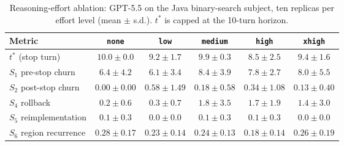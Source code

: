 \begin{table}[t]
\centering
\caption{Reasoning-effort ablation: GPT-5.5 on the Java binary-search subject, ten replicas per effort level (mean $\pm$ s.d.). $t^{*}$ is capped at the 10-turn horizon.}
\label{tab:app-reasoning}
\small
\begin{tabular}{lccccc}
\toprule
Metric & \texttt{none} & \texttt{low} & \texttt{medium} & \texttt{high} & \texttt{xhigh} \\
\midrule
$t^{*}$ (stop turn) & $10.0 \pm 0.0$ & $9.2 \pm 1.7$ & $9.9 \pm 0.3$ & $8.5 \pm 2.5$ & $9.4 \pm 1.6$ \\
$S_1$ pre-stop churn & $6.4 \pm 4.2$ & $6.1 \pm 3.4$ & $8.4 \pm 3.9$ & $7.8 \pm 2.7$ & $8.0 \pm 5.5$ \\
$S_2$ post-stop churn & $0.00 \pm 0.00$ & $0.58 \pm 1.49$ & $0.18 \pm 0.58$ & $0.34 \pm 1.08$ & $0.13 \pm 0.40$ \\
$S_4$ rollback & $0.2 \pm 0.6$ & $0.3 \pm 0.7$ & $1.8 \pm 3.5$ & $1.7 \pm 1.9$ & $1.4 \pm 3.0$ \\
$S_5$ reimplementation & $0.1 \pm 0.3$ & $0.0 \pm 0.0$ & $0.1 \pm 0.3$ & $0.1 \pm 0.3$ & $0.0 \pm 0.0$ \\
$S_6$ region recurrence & $0.28 \pm 0.17$ & $0.23 \pm 0.14$ & $0.24 \pm 0.13$ & $0.18 \pm 0.14$ & $0.26 \pm 0.19$ \\
\bottomrule
\end{tabular}
\end{table}
